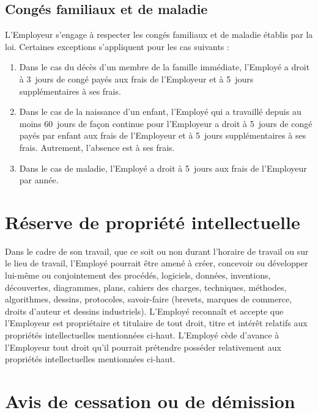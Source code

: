 \documentclass{article}
\begin{document}
    	\subsection{Congés familiaux et de maladie}
    	L'Employeur s'engage à respecter les congés familiaux et de maladie établis par la loi. Certaines exceptions s'appliquent pour les cas suivants :
    	
    	\begin{enumerate}
    		\item Dans le cas du décès d'un membre de la famille immédiate, l'Employé a droit à 3~jours de congé payés aux frais de l'Employeur et à 5~jours supplémentaires à ses frais.
    	
   			\item Dans le cas de la naissance d'un enfant, l'Employé qui a travaillé depuis au moins 60~jours de façon continue pour l'Employeur a droit à 5~jours de congé payés par enfant aux frais de l'Employeur et à 5~jours supplémentaires à ses frais. Autrement, l'absence est à ses frais.

   			\item Dans le cas de maladie, l'Employé a droit à 5~jours aux frais de l'Employeur par année.

    	\end{enumerate}
    	
    \section{Réserve de propriété intellectuelle}
    Dans le cadre de son travail, que ce soit ou non durant l'horaire de travail ou sur le lieu de travail, l'Employé pourrait être amené à créer, concevoir ou développer lui-même ou conjointement des procédés, logiciels, données, inventions, découvertes, diagrammes, plans, cahiers des charges, techniques, méthodes, algorithmes, dessins, protocoles, savoir-faire (brevets, marques de commerce, droits d'auteur et dessins industriels).
        L'Employé reconnaît et accepte que l'Employeur est propriétaire et titulaire de tout droit, titre et intérêt relatifs aux propriétés intellectuelles mentionnées ci-haut.
        L'Employé cède d'avance à l'Employeur tout droit qu'il pourrait prétendre posséder relativement aux propriétés intellectuelles mentionnées ci-haut.
    
    \section{Avis de cessation ou de démission}
\end{document}
